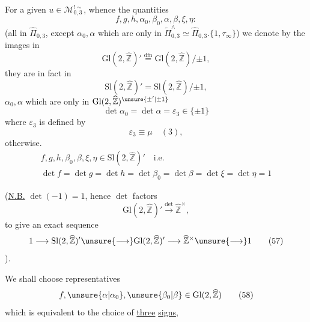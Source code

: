 For a given $u\in\mathcal M_{0,3}^{!\sim}$, whence the quantities
\[
f,g,h,\alpha_0,\beta_0,\alpha,\beta,\xi,\eta:
\tag{53}
\]
(all in $\widehat{\Pi}_{0,3}$, except $\alpha_0,\alpha$ which are only in $\widetilde{\Pi}_{0,3}^{\wedge}\simeq\widehat{\Pi}_{0,3}.\{1,\tau_\infty\}$) we denote by the   images in 
\[
\mathrm{Gl}(2,\widehat{\mathbb Z})'\stackrel{\mathrm{dfn}}{=}\mathrm{Gl}(2,\widehat{\mathbb Z})/\mathord{\pm}1,
\]
they are in fact in
\[
\mathrm{Sl}(2,\widehat{\mathbb Z})'=\mathrm{Sl}(2,\widehat{\mathbb Z})/\mathord{\pm}1,
\]
 $\alpha_0,\alpha$ which are only in $\mathrm{Gl}(2,\widehat{\mathbb Z})^{\unsure{\pm'|\pm1}}$
\[
\det\alpha_0=\det\alpha=\varepsilon_3\in\{\pm1\}
\tag{54}
\]
where $\varepsilon_3$ is defined by
\[
\varepsilon_3\equiv\mu\quad(3),
\tag{55}
\]
 otherwise.
\[
\begin{gathered}
f,g,h,\beta_0,\beta,\xi,\eta\in\mathrm{Sl}(2,\widehat{\mathbb Z})'\quad\text{i.e.}\\
\det f=\det g=\det h=\det\beta_0=\det\beta=\det\xi=\det\eta=1
\end{gathered}
\tag{56}
\]

(\uline{N.B.}   $\det(-1)=1$, hence $\det$ factors
\[
\mathrm{Gl}(2,\widehat{\mathbb Z})'\xrightarrow{\det}\widehat{\mathbb Z}^{\times},
\]
to give an exact sequence
\[
1\longrightarrow\mathrm{Sl}(2,\widehat{\mathbb Z})'\unsure{\longrightarrow}\mathrm{Gl}(2,\widehat{\mathbb Z})'\longrightarrow\widehat{\mathbb Z}^{\times}\unsure{\longrightarrow}1
\tag{57}
\]
).

We shall choose representatives
\[
f,\unsure{\alpha|\alpha_0},\unsure{\beta_0|\beta}\in\mathrm{Gl}(2,\widehat{\mathbb Z})
\tag{58}
\]
which is equivalent to the choice of \uline{three} \uline{signs},


